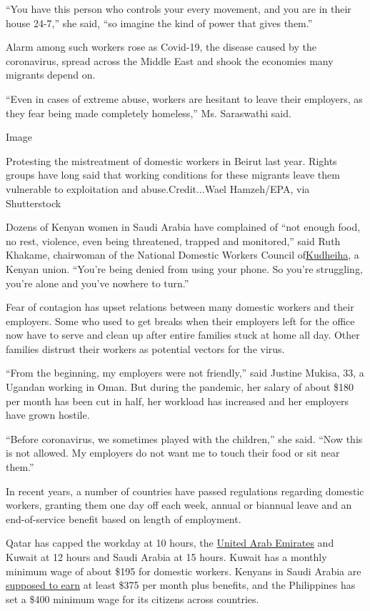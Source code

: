 ``You have this person who controls your every movement, and you are in
their house 24-7,'' she said, ``so imagine the kind of power that gives
them.''

Alarm among such workers rose as Covid-19, the disease caused by the
coronavirus, spread across the Middle East and shook the economies many
migrants depend on.

``Even in cases of extreme abuse, workers are hesitant to leave their
employers, as they fear being made completely homeless,'' Ms. Saraswathi
said.

Image

Protesting the mistreatment of domestic workers in Beirut last year.
Rights groups have long said that working conditions for these migrants
leave them vulnerable to exploitation and abuse.Credit...Wael
Hamzeh/EPA, via Shutterstock

Dozens of Kenyan women in Saudi Arabia have complained of ``not enough
food, no rest, violence, even being threatened, trapped and monitored,''
said Ruth Khakame, chairwoman of the National Domestic Workers Council
of\href{http://www.kudheiha.org/}{Kudheiha}, a Kenyan union. ``You're
being denied from using your phone. So you're struggling, you're alone
and you've nowhere to turn.''

Fear of contagion has upset relations between many domestic workers and
their employers. Some who used to get breaks when their employers left
for the office now have to serve and clean up after entire families
stuck at home all day. Other families distrust their workers as
potential vectors for the virus.

``From the beginning, my employers were not friendly,'' said Justine
Mukisa, 33, a Ugandan working in Oman. But during the pandemic, her
salary of about \$180 per month has been cut in half, her workload has
increased and her employers have grown hostile.

``Before coronavirus, we sometimes played with the children,'' she said.
``Now this is not allowed. My employers do not want me to touch their
food or sit near them.''

In recent years, a number of countries have passed regulations regarding
domestic workers, granting them one day off each week, annual or
biannual leave and an end-of-service benefit based on length of
employment.

Qatar has capped the workday at 10 hours, the
\href{https://www.nytimes.com/2020/07/14/science/mars-united-arab-emirates.html}{United
Arab Emirates} and Kuwait at 12 hours and Saudi Arabia at 15 hours.
Kuwait has a monthly minimum wage of about \$195 for domestic workers.
Kenyans in Saudi Arabia are
\href{https://www.standardmedia.co.ke/business/article/2001310333/pact-with-saudi-arabia-raises-kenyan-workers-minimum-pay}{supposed
to earn} at least \$375 per month plus benefits, and the Philippines has
set a \$400 minimum wage for its citizens across countries.

